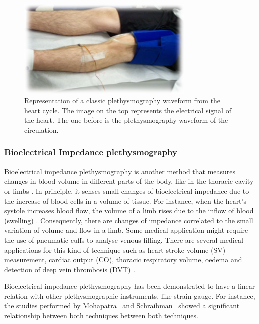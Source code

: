 \begin{figure}[!htpb]
	\centering
	\includegraphics[width=0.75\textwidth,keepaspectratio,trim={0.5cm 0.5cm 0.5cm 0.5cm}, clip]{figure6}    
	\caption[Strain gauge plethysmography]{Representation of a classic plethysmography waveform from the heart cycle. The image on the top represents the electrical signal of the heart. The one before is the plethysmography waveform of the circulation.}
	\label{fig:strain gauge}
\end{figure}

\subsubsection{Bioelectrical Impedance plethysmography}
\label{section literature BI}
Bioelectrical impedance plethysmography is another method that measures changes in blood volume in different parts of the body, like in the thoracic cavity or limbs \cite{bera2014bioelectrical}. In principle, it senses small changes of bioelectrical impedance due to the increase of blood cells in a volume of tissue. For instance, when the heart’s systole increases blood flow, the volume of a limb rises due to the inflow of blood (swelling) \cite{martinsen2011bioimpedance}. Consequently, there are changes of impedance correlated to the small variation of volume and flow in a limb. Some medical application might require the use of pneumatic cuffs to analyse venous filling. There are several medical applications for this kind of technique such as heart stroke volume (SV) measurement, cardiac output (CO), thoracic respiratory volume, oedema and detection of deep vein thrombosis (DVT) \cite{holohan1996plethysmography}. 

Bioelectrical impedance plethysmography has been demonstrated to have a linear relation with other plethysmographic instruments, like strain gauge. For instance, the studies performed by Mohapatra~\cite{mohapatra1979measurement} and Schraibman~\cite{schraibman1975comparison} showed a significant relationship between both techniques between both techniques.

